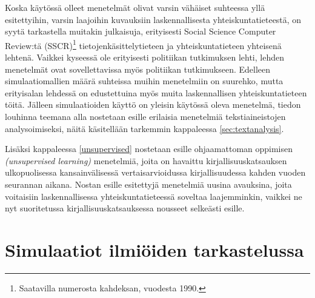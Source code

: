 \documentclass[finnish,gradu,twoside,12pt]{tktltiki}
\begin{document}
Koska käytössä olleet menetelmät olivat varsin vähäiset suhteessa yllä esitettyihin, varsin laajoihin kuvauksiin laskennallisesta yhteiskuntatieteestä, on syytä tarkastella muitakin julkaisuja, erityisesti Social Science Computer Review:tä (SSCR)\footnote{Saatavilla numerosta kahdeksan, vuodesta 1990.} tietojenkäsittelytieteen ja yhteiskuntatieteen yhteisenä lehtenä. Vaikkei kyseessä ole erityisesti politiikan tutkimuksen lehti, lehden menetelmät ovat sovellettavissa myös politiikan tutkimukseen. Edelleen simulaatiomallien määrä suhteissa muihin menetelmiin on suurehko, mutta erityisalan lehdessä on edustettuina myös muita laskennallisen yhteiskuntatieteen töitä. Jälleen simulaatioiden käyttö on yleisin käytössä oleva menetelmä, tiedon louhinna teemana alla nostetaan esille erilaisia menetelmiä tekstiaineistojen analysoimiseksi, näitä käsitellään tarkemmin kappaleessa \ref{sec:textanalysis}.

Lisäksi kappaleessa \ref{unsupervised} nostetaan esille ohjaamattoman oppimisen \textit{(unsupervised learning)} menetelmiä, joita on havaittu kirjallisuuskatsauksen ulkopuolisessa kansainvälisessä vertaisarvioidussa kirjallisuudessa kahden vuoden seurannan aikana. Nostan esille esitettyjä menetelmiä uusina avauksina, joita voitaisiin laskennallisessa yhteiskuntatieteessä soveltaa laajemminkin, vaikkei ne nyt suoritetussa kirjallisuuskatsauksessa nousseet selkeästi esille.


\section{Simulaatiot ilmiöiden tarkastelussa}
\label{simulaatio}

\end{document}
